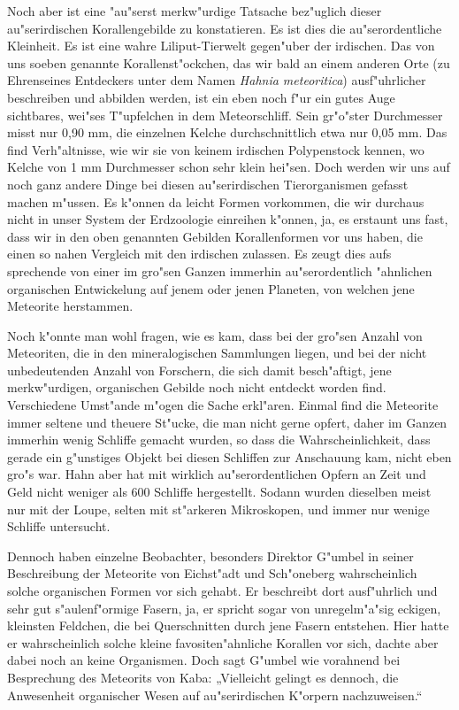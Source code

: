 \documentclass[a4paper, 12pt, oneside]{article}
\begin{document}
Noch aber ist eine "au"serst merkw"urdige Tatsache bez"uglich dieser au"serirdischen Korallengebilde zu konstatieren. Es ist dies die au"serordentliche Kleinheit. Es ist eine wahre Liliput-Tierwelt gegen"uber der irdischen. Das von uns soeben genannte Korallenst"ockchen, das wir bald an einem anderen Orte (zu Ehrenseines Entdeckers unter dem Namen \emph{Hahnia meteoritica}) ausf"uhrlicher beschreiben und abbilden werden, ist ein eben noch f"ur ein gutes Auge sichtbares, wei"ses T"upfelchen in dem Meteorschliff. Sein gr"o"ster Durchmesser misst nur 0,90 mm, die einzelnen Kelche durchschnittlich etwa nur 0,05 mm. Das find Verh"altnisse, wie wir sie von keinem irdischen Polypenstock kennen, wo Kelche von 1 mm Durchmesser schon sehr klein hei"sen. Doch werden wir uns auf noch ganz andere Dinge bei diesen au"serirdischen Tierorganismen gefasst machen m"ussen. Es k"onnen da leicht Formen vorkommen, die wir durchaus nicht in unser System der Erdzoologie einreihen k"onnen, ja, es erstaunt uns fast, dass wir in den oben genannten Gebilden Korallenformen vor uns haben, die einen so nahen Vergleich mit den irdischen zulassen. Es zeugt dies aufs sprechende von einer im gro"sen Ganzen immerhin au"serordentlich "ahnlichen organischen Entwickelung auf jenem oder jenen Planeten, von welchen jene Meteorite herstammen.

Noch k"onnte man wohl fragen, wie es kam, dass bei der gro"sen Anzahl von Meteoriten, die in den mineralogischen Sammlungen liegen, und bei der nicht unbedeutenden Anzahl von Forschern, die sich damit besch"aftigt, jene merkw"urdigen, organischen Gebilde noch nicht entdeckt worden find. Verschiedene Umst"ande m"ogen die Sache erkl"aren. Einmal find die Meteorite immer seltene und theuere St"ucke, die man nicht gerne opfert, daher im Ganzen immerhin wenig Schliffe gemacht wurden, so dass die Wahrscheinlichkeit, dass gerade ein g"unstiges Objekt bei diesen Schliffen zur Anschauung kam, nicht eben gro"s war. Hahn aber hat mit wirklich au"serordentlichen Opfern an Zeit und Geld nicht weniger als 600 Schliffe hergestellt. Sodann wurden dieselben meist nur mit der Loupe, selten mit st"arkeren Mikroskopen, und immer nur wenige Schliffe untersucht.

Dennoch haben einzelne Beobachter, besonders Direktor G"umbel in seiner Beschreibung der Meteorite von Eichst"adt und Sch"oneberg wahrscheinlich solche organischen Formen vor sich gehabt. Er beschreibt dort ausf"uhrlich und sehr gut s"aulenf"ormige Fasern, ja, er spricht sogar von unregelm"a"sig eckigen, kleinsten Feldchen, die bei Querschnitten durch jene Fasern entstehen. Hier hatte er wahrscheinlich solche kleine favositen"ahnliche Korallen vor sich, dachte aber dabei noch an keine Organismen. Doch sagt G"umbel wie vorahnend bei Besprechung des Meteorits von Kaba: „Vielleicht gelingt es dennoch, die Anwesenheit organischer Wesen auf au"serirdischen K"orpern nachzuweisen.“
\end{document}
